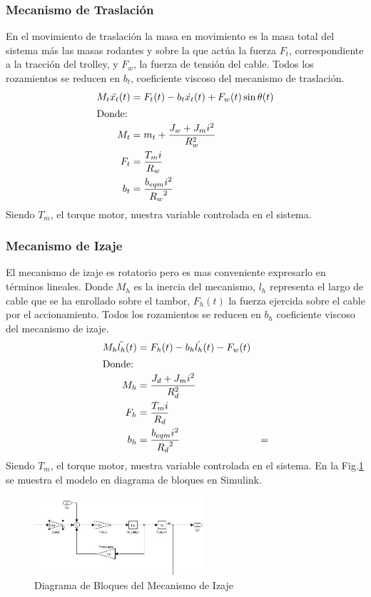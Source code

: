 \documentclass[journal]{IEEEtran}
\begin{document}
\subsubsection{Mecanismo de Traslación}
\label{sec:mecTras}
En el movimiento de traslación la masa en movimiento es la masa
total del sistema más las masas rodantes y sobre la que actúa 
la fuerza $F_t$, correspondiente a la tracción del trolley, y $F_w$, 
la fuerza de tensión del cable. Todos los rozamientos se reducen 
en $b_t$, coeficiente viscoso del mecanismo de traslación.
\begin{align}
    M_t \ddot{x_t}(t) &=  F_t(t) - b_t \dot{x_t}(t) + F_w(t) \sin \theta(t)\\
    \intertext{Donde:}
    M_t &= m_t + \dfrac{J_{w}+J_{m} i^2}{R_{w}^2} \\
    F_t &= \dfrac{T_{m} i}{R_{w}} \\
    b_t &= \dfrac{b_{eqm} i^2}{{R_{w}}^2}
\end{align}
Siendo $T_{m}$, el torque motor, nuestra variable controlada en el sistema.

\subsubsection{Mecanismo de Izaje}
\label{sec:mecIza}
El mecanismo de izaje es rotatorio pero es mas conveniente expresarlo
en términos lineales. Donde $M_h$ es la inercia del mecanismo, 
$l_h$ representa el largo de cable
que se ha enrollado sobre el tambor, $F_h(t)$ la fuerza ejercida
sobre el cable por el accionamiento. Todos los rozamientos se reducen 
en $b_h$ coeficiente viscoso del mecanismo de izaje.
\begin{align}
    M_h \ddot{l_h}(t) &=  F_h(t) - b_h \dot{l_h}(t) - F_w(t) \\
    \intertext{Donde:}
    M_h &= \dfrac{J_{d}+J_{m} i^2}{R_{d}^2} \\
    F_h &= \dfrac{T_{m} i}{R_{d}} \\
    b_h &= \dfrac{b_{eqm} i^2}{{R_{d}}^2} &= 
\end{align}
Siendo $T_{m}$, el torque motor, nuestra variable controlada en el sistema.
En la Fig.\ref{fig:fisica} se muestra el modelo en diagrama de bloques en Simulink.
\begin{figure}[!t]
 \centering
  \includegraphics[width=2.5in]{analisis_sistema_fisico.jpeg}
  \caption{Diagrama de Bloques del Mecanismo de Izaje}
  \label{fig:fisica}
\end{figure}
\end{document}
